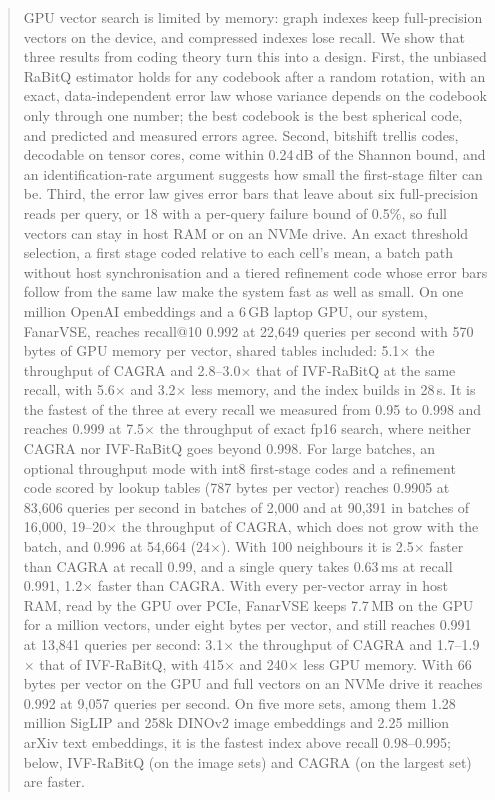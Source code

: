 \documentclass[fleqn,10pt]{wlscirep}
\begin{document}
\begin{abstract}
GPU vector search is limited by memory: graph indexes keep full-precision vectors on the device, and compressed indexes lose recall. We show that three results from coding theory turn this into a design. First, the unbiased RaBitQ estimator holds for any codebook after a random rotation, with an exact, data-independent error law whose variance depends on the codebook only through one number; the best codebook is the best spherical code, and predicted and measured errors agree. Second, bitshift trellis codes, decodable on tensor cores, come within 0.24\,dB of the Shannon bound, and an identification-rate argument suggests how small the first-stage filter can be. Third, the error law gives error bars that leave about six full-precision reads per query, or 18 with a per-query failure bound of 0.5\%, so full vectors can stay in host RAM or on an NVMe drive. An exact threshold selection, a first stage coded relative to each cell's mean, a batch path without host synchronisation and a tiered refinement code whose error bars follow from the same law make the system fast as well as small. On one million OpenAI embeddings and a 6\,GB laptop GPU, our system, FanarVSE, reaches recall@10 0.992 at 22{,}649 queries per second with 570 bytes of GPU memory per vector, shared tables included: 5.1$\times$ the throughput of CAGRA and 2.8--3.0$\times$ that of IVF-RaBitQ at the same recall, with 5.6$\times$ and 3.2$\times$ less memory, and the index builds in 28\,s. It is the fastest of the three at every recall we measured from 0.95 to 0.998 and reaches 0.999 at 7.5$\times$ the throughput of exact fp16 search, where neither CAGRA nor IVF-RaBitQ goes beyond 0.998. For large batches, an optional throughput mode with int8 first-stage codes and a refinement code scored by lookup tables (787 bytes per vector) reaches 0.9905 at 83{,}606 queries per second in batches of 2{,}000 and at 90{,}391 in batches of 16{,}000, 19--20$\times$ the throughput of CAGRA, which does not grow with the batch, and 0.996 at 54{,}664 (24$\times$). With 100 neighbours it is 2.5$\times$ faster than CAGRA at recall 0.99, and a single query takes 0.63\,ms at recall 0.991, 1.2$\times$ faster than CAGRA. With every per-vector array in host RAM, read by the GPU over PCIe, FanarVSE keeps 7.7\,MB on the GPU for a million vectors, under eight bytes per vector, and still reaches 0.991 at 13{,}841 queries per second: 3.1$\times$ the throughput of CAGRA and 1.7--1.9$\times$ that of IVF-RaBitQ, with 415$\times$ and 240$\times$ less GPU memory. With 66 bytes per vector on the GPU and full vectors on an NVMe drive it reaches 0.992 at 9{,}057 queries per second. On five more sets, among them 1.28 million SigLIP and 258k DINOv2 image embeddings and 2.25 million arXiv text embeddings, it is the fastest index above recall 0.98--0.995; below, IVF-RaBitQ (on the image sets) and CAGRA (on the largest set) are faster.
\end{abstract}
\maketitle
\end{document}
